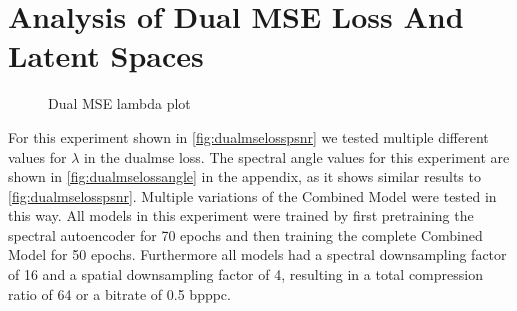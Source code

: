 \section{Analysis of Dual MSE Loss And Latent Spaces \label{sec:ch5dualmse}}
\begin{figure}
	\centering
	\datatable
	\caption{Dual MSE lambda plot}
	\label{fig:dualmselosspsnr}
	\end{figure}
For this experiment shown in \autoref{fig:dualmselosspsnr} we tested multiple different values for $\lambda$ in the \ac{dualmse} loss. The spectral angle values for this experiment are shown in \autoref{fig:dualmselossangle} in the appendix, as it shows similar results to \autoref{fig:dualmselosspsnr}. Multiple variations of the Combined Model were tested in this way. All models in this experiment were trained by first pretraining the spectral autoencoder for 70 epochs and then training the complete Combined Model for 50 epochs. Furthermore all models had a spectral downsampling factor of 16 and a spatial downsampling factor of 4, resulting in a total compression ratio of 64 or a bitrate of 0.5 \ac{bpppc}.

